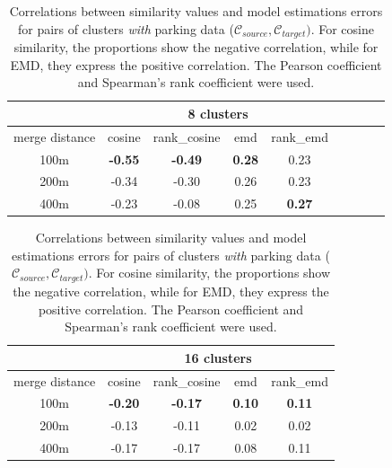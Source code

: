 \begin{table}[!ht]
	{\color{orange}
	\centering
	\small
	\begin{tabular}{ | c | c | c | c | c | c | c | c | c |}
		\hline
		{} & \multicolumn{4}{c|}{8 clusters} \\ \hline
		{merge distance} & cosine & rank\_cosine & emd & rank\_emd \\ \hline
		100m & \textbf{-0.55} & \textbf{-0.49} & \textbf{0.28} & 0.23 \\ \hline
		200m & -0.34 & -0.30 & 0.26	& 0.23 \\ \hline
		400m & -0.23 & -0.08 & 0.25 & \textbf{0.27} \\ \hline
	\end{tabular}%
	\vspace{3em}
	\begin{tabular}{ | c | c | c | c | c | }
		\hline
		{} & \multicolumn{4}{c|}{16 clusters} \\ \hline
		{merge distance} & cosine & rank\_cosine & emd & rank\_emd \\ \hline
		100m & \textbf{-0.20} & \textbf{-0.17} & \textbf{0.10} & \textbf{0.11} \\ \hline
		200m & -0.13 & -0.11 & 0.02 & 0.02 \\ \hline
		400m & -0.17 & -0.17 & 0.08 & 0.11 \\ \hline
	\end{tabular}
	
	\caption{\color{orange}Correlations between similarity values and model estimations errors for pairs of clusters \textit{with} parking data ($\mathcal{C}_{source}, \mathcal{C}_{target})$.
For cosine similarity, the proportions show the negative correlation, while for EMD, they express the positive correlation.
The Pearson coefficient and Spearman's rank coefficient were used. }
	\label{evaluation:similarity_vs_estimation}
	} %
\end{table}	

